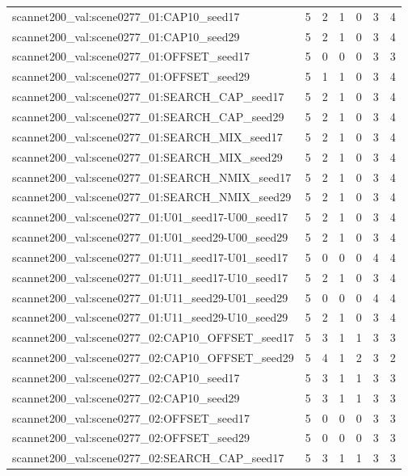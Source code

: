 \begin{table}[t]
\begin{tabular}{lrrrrrr}
scannet200\_val:scene0277\_01:CAP10\_seed17 & 5 & 2 & 1 & 0 & 3 & 4 \\
scannet200\_val:scene0277\_01:CAP10\_seed29 & 5 & 2 & 1 & 0 & 3 & 4 \\
scannet200\_val:scene0277\_01:OFFSET\_seed17 & 5 & 0 & 0 & 0 & 3 & 3 \\
scannet200\_val:scene0277\_01:OFFSET\_seed29 & 5 & 1 & 1 & 0 & 3 & 4 \\
scannet200\_val:scene0277\_01:SEARCH\_CAP\_seed17 & 5 & 2 & 1 & 0 & 3 & 4 \\
scannet200\_val:scene0277\_01:SEARCH\_CAP\_seed29 & 5 & 2 & 1 & 0 & 3 & 4 \\
scannet200\_val:scene0277\_01:SEARCH\_MIX\_seed17 & 5 & 2 & 1 & 0 & 3 & 4 \\
scannet200\_val:scene0277\_01:SEARCH\_MIX\_seed29 & 5 & 2 & 1 & 0 & 3 & 4 \\
scannet200\_val:scene0277\_01:SEARCH\_NMIX\_seed17 & 5 & 2 & 1 & 0 & 3 & 4 \\
scannet200\_val:scene0277\_01:SEARCH\_NMIX\_seed29 & 5 & 2 & 1 & 0 & 3 & 4 \\
scannet200\_val:scene0277\_01:U01\_seed17-U00\_seed17 & 5 & 2 & 1 & 0 & 3 & 4 \\
scannet200\_val:scene0277\_01:U01\_seed29-U00\_seed29 & 5 & 2 & 1 & 0 & 3 & 4 \\
scannet200\_val:scene0277\_01:U11\_seed17-U01\_seed17 & 5 & 0 & 0 & 0 & 4 & 4 \\
scannet200\_val:scene0277\_01:U11\_seed17-U10\_seed17 & 5 & 2 & 1 & 0 & 3 & 4 \\
scannet200\_val:scene0277\_01:U11\_seed29-U01\_seed29 & 5 & 0 & 0 & 0 & 4 & 4 \\
scannet200\_val:scene0277\_01:U11\_seed29-U10\_seed29 & 5 & 2 & 1 & 0 & 3 & 4 \\
scannet200\_val:scene0277\_02:CAP10\_OFFSET\_seed17 & 5 & 3 & 1 & 1 & 3 & 3 \\
scannet200\_val:scene0277\_02:CAP10\_OFFSET\_seed29 & 5 & 4 & 1 & 2 & 3 & 2 \\
scannet200\_val:scene0277\_02:CAP10\_seed17 & 5 & 3 & 1 & 1 & 3 & 3 \\
scannet200\_val:scene0277\_02:CAP10\_seed29 & 5 & 3 & 1 & 1 & 3 & 3 \\
scannet200\_val:scene0277\_02:OFFSET\_seed17 & 5 & 0 & 0 & 0 & 3 & 3 \\
scannet200\_val:scene0277\_02:OFFSET\_seed29 & 5 & 0 & 0 & 0 & 3 & 3 \\
scannet200\_val:scene0277\_02:SEARCH\_CAP\_seed17 & 5 & 3 & 1 & 1 & 3 & 3 \\

\end{tabular}
\end{table}
